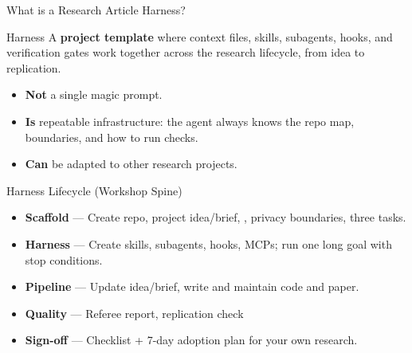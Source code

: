 \begin{frame}{What is a Research Article Harness?}
  \begin{block}{Harness}
    A \textbf{project template} where context files, skills, subagents, hooks, and verification gates work together across the research lifecycle, from idea to replication.
  \end{block}
  \vspace{0.3em}
  
  \vspace{0.3em}
  \begin{itemize}
    \item \textbf{Not} \textnormal{a single magic prompt.}
    \item \textbf{Is} \textnormal{repeatable infrastructure: the agent always knows the repo map, boundaries, and how to run checks.}
    \item \textbf{Can} \textnormal{be adapted to other research projects.}
  \end{itemize}
\end{frame}

\begin{frame}{Harness Lifecycle (Workshop Spine)}
  \begin{center}
  \end{center}
  \vspace{0.35em}
  {\small
  \begin{itemize}
    \item \textbf{Scaffold} \textnormal{--- Create repo, project idea/brief, , privacy boundaries, three tasks.}
    \item \textbf{Harness} \textnormal{--- Create skills, subagents, hooks, MCPs; run one long goal with stop conditions.}
    \item \textbf{Pipeline} \textnormal{--- Update idea/brief, write and maintain code and paper.}
    \item \textbf{Quality} \textnormal{--- Referee report, replication check}
    \item \textbf{Sign-off} \textnormal{--- Checklist + 7-day adoption plan for your own research.}
  \end{itemize}}
\end{frame}

